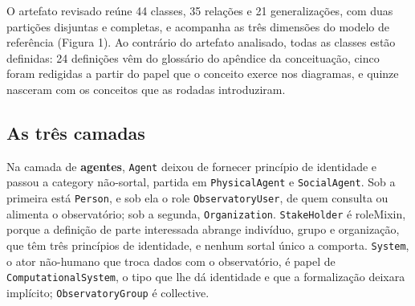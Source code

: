 O artefato revisado reúne 44 classes, 35 relações e 21 generalizações, com duas partições disjuntas e completas, e acompanha as três dimensões do modelo de referência (Figura 1). Ao contrário do artefato analisado, todas as classes estão definidas: 24 definições vêm do glossário do apêndice da conceituação, cinco foram redigidas a partir do papel que o conceito exerce nos diagramas, e quinze nasceram com os conceitos que as rodadas introduziram.

\subsection{As três camadas}

Na camada de \textbf{agentes}, \texttt{Agent} deixou de fornecer princípio de identidade e passou a \guillemotleft{}category\guillemotright{} não-sortal, partida em \texttt{PhysicalAgent} e \texttt{SocialAgent}. Sob a primeira está \texttt{Person}, e sob ela o \guillemotleft{}role\guillemotright{} \texttt{ObservatoryUser}, de quem consulta ou alimenta o observatório; sob a segunda, \texttt{Organization}. \texttt{StakeHolder} é \guillemotleft{}roleMixin\guillemotright{}, porque a definição de parte interessada abrange indivíduo, grupo e organização, que têm três princípios de identidade, e nenhum sortal único a comporta. \texttt{System}, o ator não-humano que troca dados com o observatório, é papel de \texttt{ComputationalSystem}, o tipo que lhe dá identidade e que a formalização deixara implícito; \texttt{ObservatoryGroup} é \guillemotleft{}collective\guillemotright{}.

